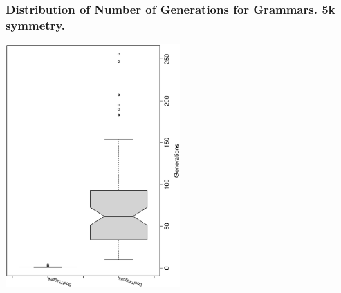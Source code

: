  \begin{frame}
 \frametitle{ Distribution of Number of Generations for Grammars. 5k  symmetry. }
 \begin{center}
\includegraphics[width=0.5\textwidth, angle=-90]
{ExpEboxplottGenerations003.eps}
 \end{center}
 \label{ExpEboxplottGenerations003.eps}  
 \end{frame}

